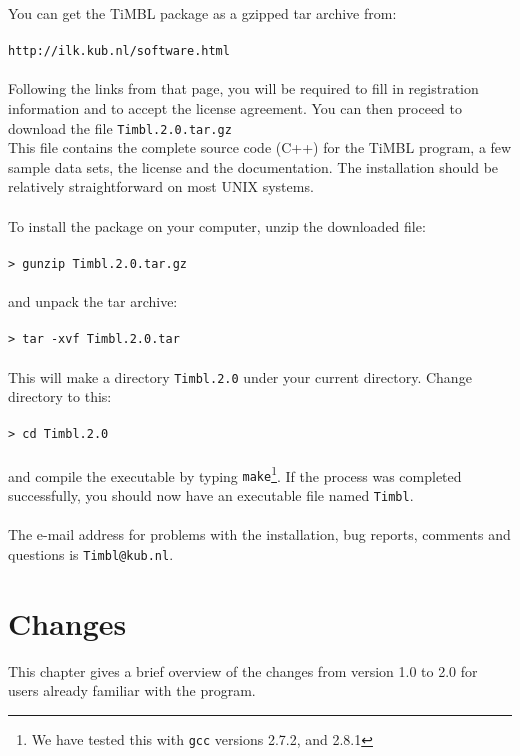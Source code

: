 \documentclass{report}
\begin{document}
You can get the TiMBL package as a gzipped tar archive from:\\
\\
{\tt http://ilk.kub.nl/software.html}\\
\\
Following the links from that page, you will be required to fill in
registration information and to accept the license agreement. You can
then proceed to download the file {\tt Timbl.2.0.tar.gz}\\
This file contains the complete source code (C++) for the TiMBL
program, a few sample data sets, the license and the documentation. The
installation should be relatively straightforward on most UNIX systems.\\
\\
To install the package on your computer, unzip the downloaded file:\\
\\
{\tt > gunzip Timbl.2.0.tar.gz}\\
\\
and unpack the tar archive:\\
\\
{\tt > tar -xvf Timbl.2.0.tar}\\
\\
This will make a directory {\tt Timbl.2.0} under your current directory. Change
directory to this:\\
\\
{\tt > cd Timbl.2.0}\\
\\
and compile the executable by typing {\tt make}\footnote{We have
tested this with {\tt gcc} versions 2.7.2, and 2.8.1}.  If
the process was completed successfully, you should now have an
executable file named {\tt Timbl}.\\
\\
The e-mail address for problems with the installation, bug reports,
comments and questions is {\tt Timbl@kub.nl}.

\chapter{Changes}
\label{changes}

This chapter gives a brief overview of the changes from version 1.0 to
2.0 for users already familiar with the program.
\end{document}
